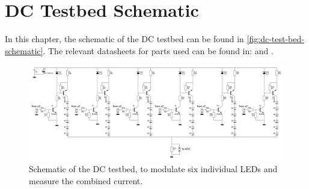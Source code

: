 
\chapter{DC Testbed Schematic}
\label{app:dc-test-bed-schematic}

In this chapter, the schematic of the DC testbed can be found in \autoref{fig:dc-test-bed-schematic}.
The relevant datasheets for parts used can be found in: \cite{2n3904-npn-transistor-datasheet} and \cite{bc556-pnp-transistor-datasheet}.

\begin{figure}[htb]
	\includegraphics[angle=90,width=\textwidth,height=.9\textheight,keepaspectratio]{chapters/appendix/dc-test-bed/dc-test-bed-schematic.jpg}
	\caption{Schematic of the DC testbed, to modulate six individual LEDs and measure the combined current.}
	\label{fig:dc-test-bed-schematic}
\end{figure}

